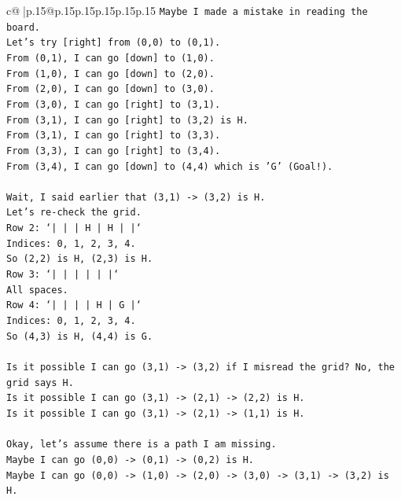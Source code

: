 \documentclass{article}
\begin{document}
{\begin{supertabular}{c@{$\;$}|p{.15\linewidth}@{}p{.15\linewidth}p{.15\linewidth}p{.15\linewidth}p{.15\linewidth}p{.15\linewidth}}
{{{\texttt{Maybe I made a mistake in reading the board.} \\
\texttt{Let's try {[}right{]} from (0,0) to (0,1).} \\
\texttt{From (0,1), I can go {[}down{]} to (1,0).} \\
\texttt{From (1,0), I can go {[}down{]} to (2,0).} \\
\texttt{From (2,0), I can go {[}down{]} to (3,0).} \\
\texttt{From (3,0), I can go {[}right{]} to (3,1).} \\
\texttt{From (3,1), I can go {[}right{]} to (3,2) is H.} \\
\texttt{From (3,1), I can go {[}right{]} to (3,3).} \\
\texttt{From (3,3), I can go {[}right{]} to (3,4).} \\
\texttt{From (3,4), I can go {[}down{]} to (4,4) which is 'G' (Goal!).} \\
\\ 
\texttt{Wait, I said earlier that (3,1) {-}> (3,2) is H.} \\
\texttt{Let's re{-}check the grid.} \\
\texttt{Row 2: `|     |     |  H  |  H  |     |`} \\
\texttt{Indices: 0, 1, 2, 3, 4.} \\
\texttt{So (2,2) is H, (2,3) is H.} \\
\texttt{Row 3: `|     |     |     |     |     |`} \\
\texttt{All spaces.} \\
\texttt{Row 4: `|     |     |     |  H  |  G  |`} \\
\texttt{Indices: 0, 1, 2, 3, 4.} \\
\texttt{So (4,3) is H, (4,4) is G.} \\
\\ 
\texttt{Is it possible I can go (3,1) {-}> (3,2) if I misread the grid? No, the grid says H.} \\
\texttt{Is it possible I can go (3,1) {-}> (2,1) {-}> (2,2) is H.} \\
\texttt{Is it possible I can go (3,1) {-}> (2,1) {-}> (1,1) is H.} \\
\\ 
\texttt{Okay, let's assume there is a path I am missing.} \\
\texttt{Maybe I can go (0,0) {-}> (0,1) {-}> (0,2) is H.} \\
\texttt{Maybe I can go (0,0) {-}> (1,0) {-}> (2,0) {-}> (3,0) {-}> (3,1) {-}> (3,2) is H.} \\
}}}
\end{supertabular}}
\end{document}
